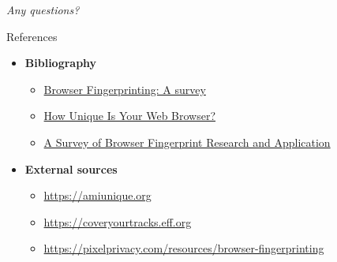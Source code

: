 \begin{frame}
  \centering \Huge \emph{Any questions?}
\end{frame}

\begin{frame}{References}
  \begin{itemize}
    \item \textbf{Bibliography}
          \begin{itemize}
            \item \href{https://arxiv.org/pdf/1905.01051.pdf}{Browser Fingerprinting: A survey}
            \item \href{https://coveryourtracks.eff.org/static/browser-uniqueness.pdf}{How Unique Is Your Web Browser?}
            \item \href{https://downloads.hindawi.com/journals/wcmc/2022/3363335.pdf}{A Survey of Browser Fingerprint Research and Application}
          \end{itemize}
    \item \textbf{External sources}
          \begin{itemize}
            \item \href{https://amiunique.org/faq}{https://amiunique.org}
            \item \href{https://coveryourtracks.eff.org/about}{https://coveryourtracks.eff.org}
            \item \href{https://pixelprivacy.com/resources/browser-fingerprinting}{https://pixelprivacy.com/resources/browser-fingerprinting}
          \end{itemize}
  \end{itemize}
\end{frame}


